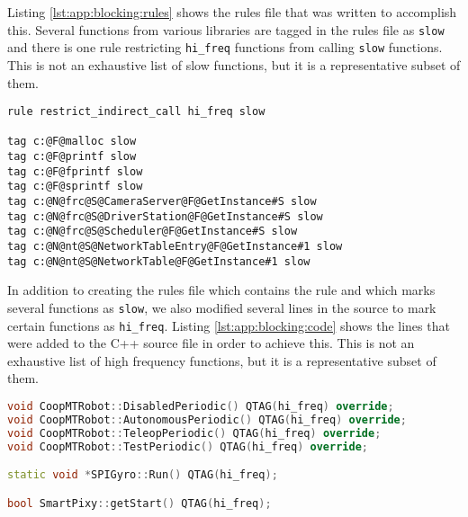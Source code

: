 Listing \ref{lst:app:blocking:rules} shows the rules file that was written to accomplish this.  Several functions from various libraries are tagged in the rules file as \lstinline{slow} and there is one rule restricting \lstinline{hi_freq} functions from calling \lstinline{slow} functions.  This is not an exhaustive list of slow functions, but it is a representative subset of them.  

\noindent\begin{minipage}[t]{\linewidth}
\begin{lstlisting}[caption={Rules file for preventing high frequency functions from calling slow functions.  Several functions from standard libraries are marked in the rules file as \lstinline{slow}.},label={lst:app:blocking:rules}]
rule restrict_indirect_call hi_freq slow

tag c:@F@malloc slow
tag c:@F@printf slow
tag c:@F@fprintf slow
tag c:@F@sprintf slow
tag c:@N@frc@S@CameraServer@F@GetInstance#S slow
tag c:@N@frc@S@DriverStation@F@GetInstance#S slow
tag c:@N@frc@S@Scheduler@F@GetInstance#S slow
tag c:@N@nt@S@NetworkTableEntry@F@GetInstance#1 slow
tag c:@N@nt@S@NetworkTable@F@GetInstance#1 slow
\end{lstlisting}
\end{minipage}

In addition to creating the rules file which contains the rule and which marks several functions as \lstinline{slow}, we also modified several lines in the source to mark certain functions as \lstinline{hi_freq}.  Listing \ref{lst:app:blocking:code} shows the lines that were added to the C++ source file in order to achieve this.  This is not an exhaustive list of high frequency functions, but it is a representative subset of them.  

\noindent\begin{minipage}[t]{\linewidth}
\begin{lstlisting}[language=c++,caption={Lines inserted into C++ source file to mark certain functions as \lstinline{hi_freq}.},label={lst:app:blocking:code}]
void CoopMTRobot::DisabledPeriodic() QTAG(hi_freq) override;
void CoopMTRobot::AutonomousPeriodic() QTAG(hi_freq) override;
void CoopMTRobot::TeleopPeriodic() QTAG(hi_freq) override;
void CoopMTRobot::TestPeriodic() QTAG(hi_freq) override;

static void *SPIGyro::Run() QTAG(hi_freq);

bool SmartPixy::getStart() QTAG(hi_freq);
\end{lstlisting}
\end{minipage}

